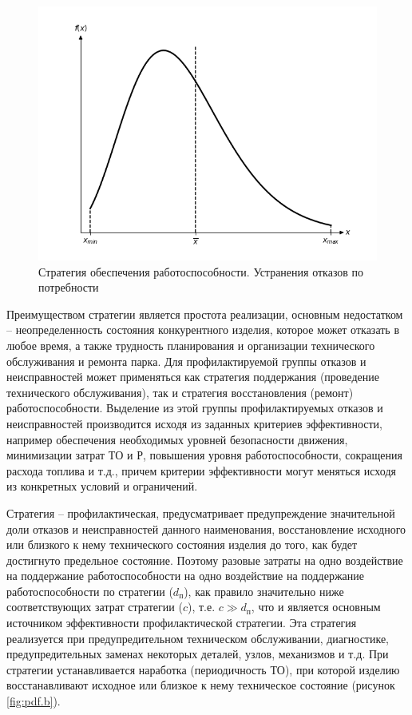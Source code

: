 \documentclass[../nirs.tex]{subfiles}
\begin{document}
\begin{figure}[H]
\centering
\includegraphics[keepaspectratio,width=\textwidth]{./images/pdf.a.png}
\caption{Стратегия обеспечения работоспособности. Устранения отказов по
    потребности}
\label{fig:pdf.a}
\end{figure}

Преимуществом стратегии  является простота реализации, основным
недостатком -- неопределенность состояния конкурентного изделия, которое может
отказать в любое время, а также трудность планирования и организации
технического обслуживания и ремонта парка. Для профилактируемой группы отказов и
неисправностей может применяться как стратегия поддержания (проведение
технического обслуживания), так и стратегия восстановления (ремонт)
работоспособности. Выделение из этой группы профилактируемых отказов и
неисправностей производится исходя из заданных критериев эффективности, например
обеспечения необходимых уровней безопасности движения, минимизации затрат ТО и
Р, повышения уровня работоспособности, сокращения расхода топлива и т.д., причем
критерии эффективности могут меняться исходя из конкретных условий и
ограничений.

Стратегия  -- профилактическая, предусматривает предупреждение
значительной доли отказов и неисправностей данного наименования, восстановление
исходного или близкого к нему технического состояния изделия до того, как будет
достигнуто предельное состояние. Поэтому разовые затраты на одно воздействие на
поддержание работоспособности на одно воздействие на поддержание
работоспособности по стратегии  ($d_{\text{п}}$), как правило значительно
ниже соответствующих затрат стратегии  ($c$), т.е. $c \gg d_{\text{п}}$,
что и является основным источником эффективности профилактической стратегии. Эта
стратегия реализуется при предупредительном техническом обслуживании,
диагностике, предупредительных заменах некоторых деталей, узлов, механизмов и
т.д. При стратегии  устанавливается наработка (периодичность ТО), при
которой изделию восстанавливают исходное или близкое к нему техническое
состояние (рисунок \ref{fig:pdf.b}).
\end{document}
